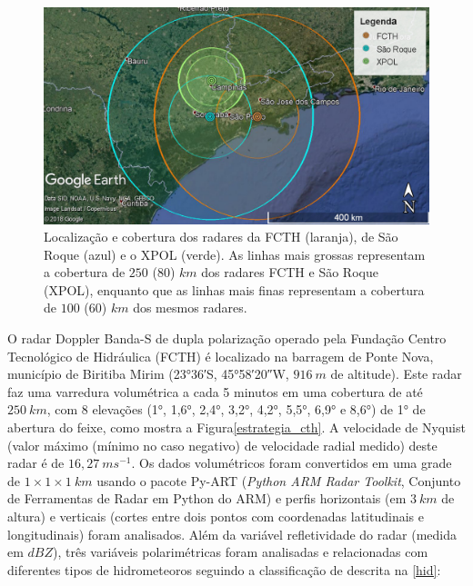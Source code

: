\begin{figure}[htb]
	\begin{center}
		\caption{Localização e cobertura dos radares da FCTH (laranja), de São Roque (azul) e o XPOL (verde). As linhas mais grossas representam a cobertura de $250$ ($80$) $km$ dos radares FCTH e São Roque (XPOL), enquanto que as linhas mais finas representam a cobertura de $100$ ($60$) $km$ dos mesmos radares.} 
		\label{cobertura_radares}
		\includegraphics[width=\columnwidth]{figs/radar_coverages_hires2_ptbr.png}
	\end{center}
\end{figure}

O radar Doppler Banda-S de dupla polarização operado pela Fundação Centro Tecnológico de Hidráulica (FCTH) é localizado na barragem de Ponte Nova, município de Biritiba Mirim (\ang{23;36;}\:S, \ang{45;58;20}\:W, $916\:m$ de altitude). Este radar faz uma varredura volumétrica a cada 5 minutos em uma cobertura de até $250\:km$, com 8 elevações (\ang{1}, \ang{1,6}, \ang{2,4}, \ang{3,2}, \ang{4,2}, \ang{5,5}, \ang{6,9} e \ang{8,6}) de \ang{1} de abertura do feixe, como mostra a Figura\autoref{estrategia_cth}. A velocidade de Nyquist (valor máximo (mínimo no caso negativo) de velocidade radial medido) deste radar é de $16,27\:ms^{-1}$. Os dados volumétricos foram convertidos em uma grade de $1 \times 1 \times 1\:km$ usando o pacote Py-ART (\textit{Python ARM Radar Toolkit}, Conjunto de Ferramentas de Radar em Python do ARM) \cite{Helmus2016} e perfis horizontais (em $3\:km$ de altura) e verticais (cortes entre dois pontos com coordenadas latitudinais e longitudinais) foram analisados. Além da variável refletividade do radar (medida em $dBZ$), três variáveis polarimétricas foram analisadas e relacionadas com diferentes tipos de hidrometeoros seguindo a classificação de  descrita na \autoref{hid}:

